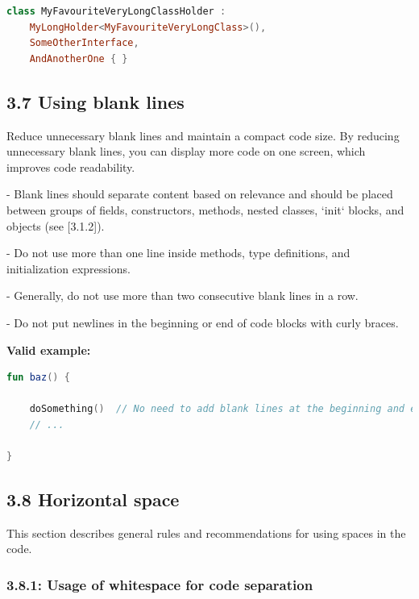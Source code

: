 {{\begin{lstlisting}[language=Kotlin]
class MyFavouriteVeryLongClassHolder :
    MyLongHolder<MyFavouriteVeryLongClass>(),
    SomeOtherInterface,
    AndAnotherOne { }
\end{lstlisting}


\subsection*{\textbf{3.7 Using blank lines}}

\label{sec:3.7}



Reduce unnecessary blank lines and maintain a compact code size. By reducing unnecessary blank lines, you can display more code on one screen, which improves code readability.

- Blank lines should separate content based on relevance and should be placed between groups of fields, constructors, methods, nested classes, `init` blocks, and objects (see [3.1.2]).

- Do not use more than one line inside methods, type definitions, and initialization expressions.

- Generally, do not use more than two consecutive blank lines in a row.

- Do not put newlines in the beginning or end of code blocks with curly braces.



\textbf{Valid example:}

\begin{lstlisting}[language=Kotlin]
fun baz() {
        
    doSomething()  // No need to add blank lines at the beginning and end of the code block
    // ...

}
\end{lstlisting}


\subsection*{\textbf{3.8 Horizontal space}}

\label{sec:3.8}

This section describes general rules and recommendations for using spaces in the code.

\subsubsection*{\textbf{3.8.1: Usage of whitespace for code separation}}
\leavevmode\newline

}}
